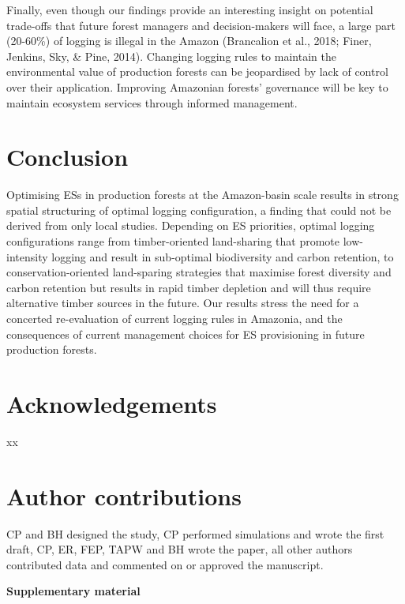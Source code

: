 \documentclass{article}
\newcommand{\beginsupplement}{%
        \setcounter{table}{0}
        \renewcommand{\thetable}{S\arabic{table}}%
        \setcounter{figure}{0}
        \renewcommand{\thefigure}{S\arabic{figure}}%
     }
\begin{document}
Finally, even though our findings provide an interesting insight on potential trade-offs that future forest managers and decision-makers will face, a large part (20-60\%) of logging is illegal in the Amazon (Brancalion et al., 2018; Finer, Jenkins, Sky, & Pine, 2014). Changing logging rules to maintain the environmental value of production forests can be jeopardised by lack of control over their application. Improving Amazonian forests' governance will be key to maintain ecosystem services through informed management. 

\section{Conclusion}
Optimising ESs in production forests at the Amazon-basin scale results in strong spatial structuring of optimal logging configuration, a finding that could not be derived from only local studies. Depending on ES priorities, optimal logging configurations range from timber-oriented land-sharing that promote low-intensity logging and result in sub-optimal biodiversity and carbon retention, to conservation-oriented land-sparing strategies that maximise forest diversity and carbon retention but results in rapid timber depletion and will thus require alternative timber sources in the future. Our results stress the need for a concerted re-evaluation of current logging rules in Amazonia, and the consequences of current management choices for ES provisioning in future production forests.


\section{Acknowledgements}
xx

\section{Author contributions}
CP and BH designed the study, CP performed simulations and wrote the first draft, CP, ER, FEP, TAPW and BH wrote the paper, all other authors contributed data and commented on or approved the manuscript.


\clearpage





\onecolumn
\beginsupplement
\appendix
\begin{center}
    { \huge \textbf{Supplementary material}}
\end{center} 
\end{document}

